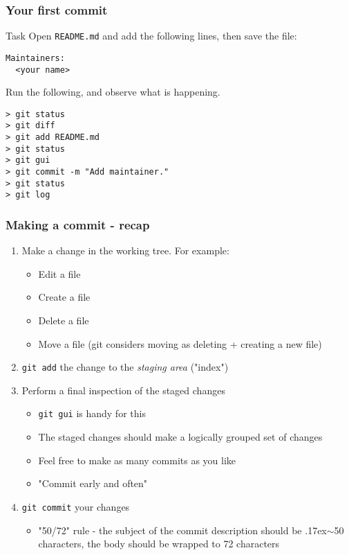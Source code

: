 
\begin{frame}[fragile]
	\frametitle{Your first commit}
	
	\begin{block}{Task}
	Open \texttt{README.md} and add the following lines, then save the file:
	\begin{verbatim}
Maintainers:
  <your name>
	\end{verbatim}
	\end{block}

Run the following, and observe what is happening.

	\begin{verbatim}
> git status
> git diff
> git add README.md
> git status
> git gui
> git commit -m "Add maintainer."
> git status
> git log
	\end{verbatim}
	
\end{frame}


\begin{frame}[fragile]

\frametitle{Making a commit - recap}
	
\begin{enumerate}
	\item Make a change in the working tree. For example:
	\begin{itemize}
	\item Edit a file
	\item Create a file
	\item Delete a file 
	\item Move a file (git considers moving as deleting + creating a new file)
	\end{itemize}
	\item \texttt {git add} the change to the \textit{staging area} ("index")
	\item Perform a final inspection of the staged changes
	\begin{itemize}
	\item \texttt{git gui} is handy for this
	\item The staged changes should make a logically grouped set of changes
	\item Feel free to make as many commits as you like
	\item "Commit early and often"
	\end{itemize}
	\item \texttt{git commit} your changes
	\begin{itemize}
	\item  "50/72" rule - the subject of the commit description should be {\raise.17ex\hbox{$\scriptstyle\sim$}}50 characters, the body should be wrapped to 72 characters
	\end{itemize}
\end{enumerate}
	
\end{frame}

